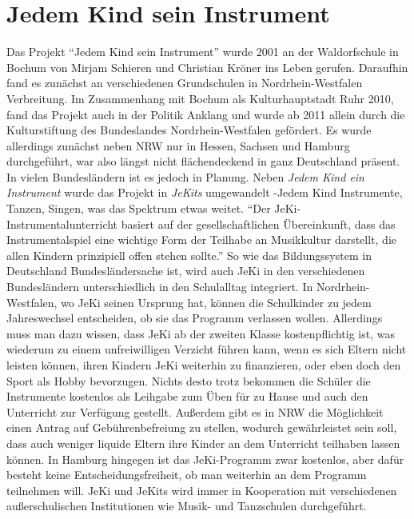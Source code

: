 \section{Jedem Kind sein Instrument}

Das Projekt \enquote{Jedem Kind sein Instrument} wurde 2001 an der Waldorfschule in
Bochum von Mirjam Schieren und Christian Kröner ins Leben gerufen. Daraufhin
fand es zunächst an verschiedenen Grundschulen in Nordrhein-Westfalen Verbreitung. Im
Zusammenhang mit Bochum als Kulturhauptstadt Ruhr 2010, fand das Projekt auch in
der Politik Anklang und wurde ab 2011 allein durch die Kulturstiftung des
Bundeslandes Nordrhein-Westfalen gefördert. Es wurde allerdings zunächst neben
NRW nur in Hessen, Sachsen und Hamburg durchgeführt, war also längst nicht
flächendeckend in ganz Deutschland präsent. In vielen Bundesländern ist es
jedoch in Planung. Neben \emph{Jedem Kind ein Instrument} wurde das Projekt in
\emph{JeKits} umgewandelt -Jedem Kind Instrumente, Tanzen, Singen, was das Spektrum
etwas weitet. \enquote{Der JeKi-Instrumentalunterricht basiert auf der
gesellschaftlichen Übereinkunft, dass das Instrumentalspiel eine wichtige Form
der Teilhabe an Musikkultur darstellt, die allen Kindern prinzipiell offen
stehen sollte.}\autocite[94]{krupp_schleussner:jeki} So wie das Bildungssystem
in Deutschland Bundesländersache ist, wird auch JeKi in den verschiedenen
Bundesländern unterschiedlich in den Schulalltag integriert. In
Nordrhein-Westfalen, wo JeKi seinen Ursprung hat, können die Schulkinder zu
jedem Jahreswechsel entscheiden, ob sie das Programm verlassen wollen.
\autocite[95]{krupp_schleussner:jeki} Allerdings muss man dazu wissen, dass JeKi
ab der zweiten Klasse kostenpflichtig ist, was wiederum zu einem unfreiwilligen
Verzicht führen kann, wenn es sich Eltern nicht leisten können, ihren Kindern
JeKi weiterhin zu finanzieren, oder eben doch den Sport als Hobby bevorzugen.
Nichts desto trotz bekommen die Schüler die Instrumente kostenlos als Leihgabe
zum Üben für zu Hause und auch den Unterricht zur Verfügung gestellt. Außerdem
gibt es in NRW die Möglichkeit einen Antrag auf Gebührenbefreiung zu stellen,
wodurch gewährleistet sein soll, dass auch weniger liquide Eltern ihre Kinder an
dem Unterricht teilhaben lassen können. In Hamburg hingegen ist das
JeKi-Programm zwar kostenlos, aber dafür besteht keine Entscheidungsfreiheit, ob
man weiterhin an dem Programm teilnehmen will.
\autocite[95]{krupp_schleussner:jeki}
JeKi und JeKits wird immer in Kooperation mit verschiedenen außerschulischen
Institutionen wie Musik- und Tanzschulen durchgeführt.

